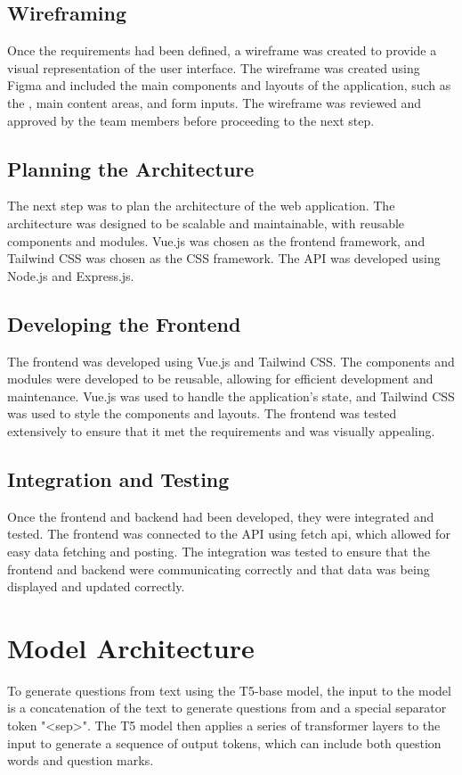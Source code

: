 \documentclass[12pt]{report}
\begin{document}
\subsection{Wireframing}

Once the requirements had been defined, a wireframe was created to provide a visual representation of the user interface. The wireframe was created using Figma and included the main components and layouts of the application, such as the , main content areas, and form inputs. The wireframe was reviewed and approved by the team members before proceeding to the next step.

\subsection{Planning the Architecture}
The next step was to plan the architecture of the web application. The architecture was designed to be scalable and maintainable, with reusable components and modules. Vue.js was chosen as the frontend framework, and Tailwind CSS was chosen as the CSS framework. The API was developed using Node.js and Express.js.

\subsection{Developing the Frontend}
The frontend was developed using Vue.js and Tailwind CSS. The components and modules were developed to be reusable, allowing for efficient development and maintenance. Vue.js was used to handle the application's state, and Tailwind CSS was used to style the components and layouts. The frontend was tested extensively to ensure that it met the requirements and was visually appealing.


\subsection{Integration and Testing}
Once the frontend and backend had been developed, they were integrated and tested. The frontend was connected to the API using fetch api, which allowed for easy data fetching and posting. The integration was tested to ensure that the frontend and backend were communicating correctly and that data was being displayed and updated correctly.

\section{Model Architecture}
 To generate questions from text using the T5-base model, the input to the model is a concatenation of the text to generate questions from and a special separator token "<sep>". The T5 model then applies a series of transformer layers to the input to generate a sequence of output tokens, which can include both question words and question marks.
\end{document}
